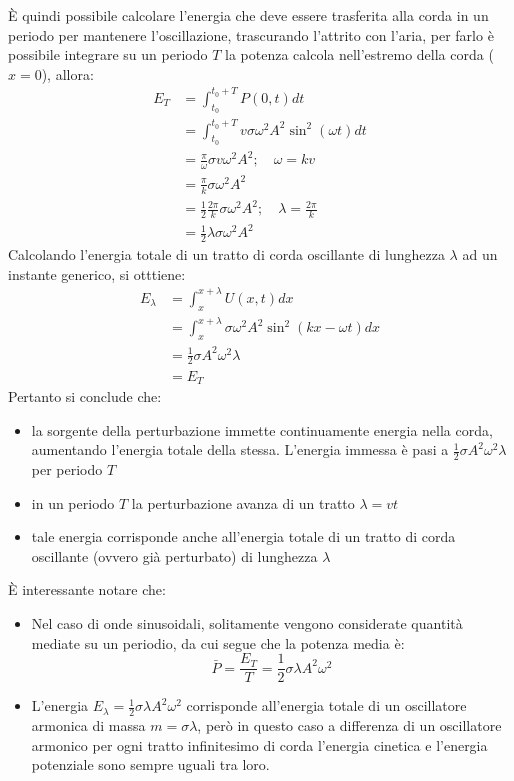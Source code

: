 \documentclass[11pt, a4paper, openright]{book}
\theoremstyle{plain}
\theoremstyle{definition}
\begin{document}
È quindi possibile calcolare l'energia che deve essere trasferita alla corda in un periodo per mantenere l'oscillazione, trascurando l'attrito con l'aria, per farlo è possibile integrare su un periodo $T$ la potenza calcola nell'estremo della corda ($x = 0$), allora:
\begin{align}
    E_T & = \int_{t_0}^{t_0 + T} P(0, t) dt \\
        & = \int_{t_0}^{t_0 + T} v\sigma\omega^2A^2\sin^2(\omega t) dt \\
        & = \frac{\pi}{\omega}\sigma v \omega^2A^2; \quad \omega = kv \\
        & = \frac{\pi}{k}\sigma\omega^2A^2 \\
        & = \frac{1}{2}\frac{2\pi}{k}\sigma\omega^2A^2; \quad \lambda = \frac{2\pi}{k} \\
        & = \frac{1}{2}\lambda\sigma\omega^2A^2
\end{align}
Calcolando l'energia totale di un tratto di corda oscillante di lunghezza $\lambda$ ad un instante generico, si otttiene:
\begin{align}
    E_\lambda & = \int_{x}^{x + \lambda} U(x, t)dx \\
              & = \int_{x}^{x + \lambda} \sigma \omega^2 A^2 \sin^2(kx - \omega t)dx \\
              & = \frac{1}{2}\sigma A^2 \omega^2 \lambda \\
              & = E_T
\end{align}
Pertanto si conclude che:
\begin{itemize}
    \item la sorgente della perturbazione immette continuamente energia nella corda, aumentando l'energia totale della stessa. L'energia immessa è pasi a $\displaystyle \frac{1}{2}\sigma A^2 \omega^2 \lambda$ per periodo $T$
    \item in un periodo $T$ la perturbazione avanza di un tratto $\lambda = vt$
    \item tale energia corrisponde anche all'energia totale di un tratto di corda oscillante (ovvero già perturbato) di lunghezza $\lambda$
\end{itemize}
È interessante notare che:
\begin{itemize}
    \item Nel caso di onde sinusoidali, solitamente vengono considerate quantità mediate su un periodio, da cui segue che la potenza media è:
    \begin{equation}
        \bar{P} = \frac{E_T}{T} = \frac{1}{2}\sigma\lambda A^2\omega^2
    \end{equation}
    \item L'energia $E_\lambda = \frac{1}{2}\sigma\lambda A^2\omega^2$ corrisponde all'energia totale di un oscillatore armonica di massa $m = \sigma\lambda$, però in questo caso a differenza di un oscillatore armonico per ogni tratto infinitesimo di corda l'energia cinetica e l'energia potenziale sono sempre uguali tra loro.
\end{itemize}
\end{document}
